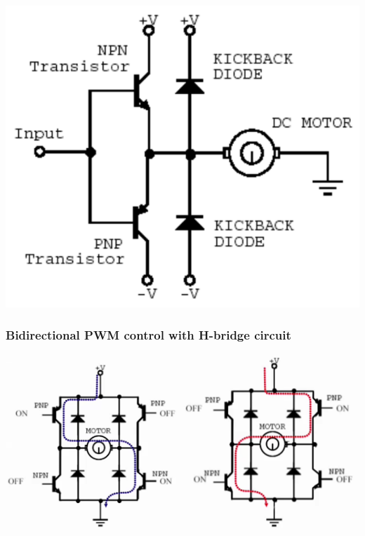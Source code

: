 \documentclass[11pt]{article}
\begin{document}
\begin{center}
\includegraphics[scale=1]{./images/bidirectional-pwm-control.png}
\end{center}
\subsubsection{Bidirectional PWM control with H-bridge circuit}
\label{sec:orga0f717f}

\begin{center}
\includegraphics[width=0.49\textwidth]{./images/bidirectional-pwm-control-with-h-bridge-clockwise.png}
\includegraphics[width=0.49\textwidth]{./images/bidirectional-pwm-control-with-h-bridge-anti-clockwise.png}
\end{center}
\end{document}
